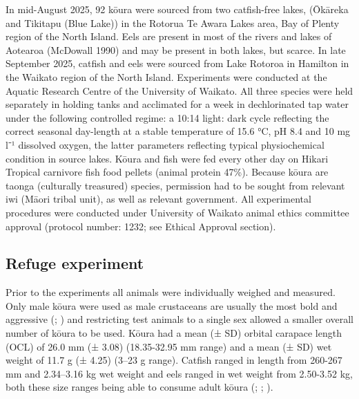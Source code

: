 \documentclass[
  letterpaper,
  DIV=11,
  numbers=noendperiod]{scrartcl}
\begin{document}
In mid-August 2025, 92 kōura were sourced from two catfish-free lakes,
(Ōkāreka and Tikitapu (Blue Lake)) in the Rotorua Te Awara Lakes area,
Bay of Plenty region of the North Island. Eels are present in most of
the rivers and lakes of Aotearoa (McDowall 1990) and may be present in
both lakes, but scarce. In late September 2025, catfish and eels were
sourced from Lake Rotoroa in Hamilton in the Waikato region of the North
Island. Experiments were conducted at the Aquatic Research Centre of the
University of Waikato. All three species were held separately in holding
tanks and acclimated for a week in dechlorinated tap water under the
following controlled regime: a 10:14 light: dark cycle reflecting the
correct seasonal day-length at a stable temperature of 15.6 °C, pH 8.4
and 10 mg l⁻¹ dissolved oxygen, the latter parameters reflecting typical
physiochemical condition in source lakes. Kōura and fish were fed every
other day on Hikari Tropical carnivore fish food pellets (animal protein
47\%). Because kōura are taonga (culturally treasured) species,
permission had to be sought from relevant iwi (Māori tribal unit), as
well as relevant government. All experimental procedures were conducted
under University of Waikato animal ethics committee approval (protocol
number: 1232; see Ethical Approval section).

\subsection{Refuge experiment}\label{refuge-experiment}

Prior to the experiments all animals were individually weighed and
measured. Only male kōura were used as male crustaceans are usually the
most bold and aggressive (; ) and
restricting test animals to a single sex allowed a smaller overall
number of kōura to be used. Kōura had a mean (± SD) orbital carapace
length (OCL) of 26.0 mm (± 3.08) (18.35-32.95 mm range) and a mean (±
SD) wet weight of 11.7 g (± 4.25) (3--23 g range). Catfish ranged in
length from 260-267 mm and 2.34--3.16 kg wet weight and eels ranged in
wet weight from 2.50-3.52 kg, both these size ranges being able to
consume adult kōura (;
; ).
\end{document}
